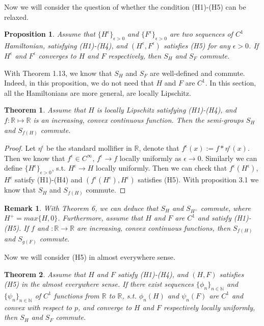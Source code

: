 \documentclass[preprint]{elsarticle}
\newtheorem{result}{\textbf{Theorem}}
\newtheorem{proposition}{Proposition}[section]
\newtheorem{remark}{Remark}[section]
\numberwithin{equation}{section}
\begin{document}
Now we will consider the question of whether the condition (H1)-(H5) can be relaxed.
\begin{proposition}
    Assume that $\{H^{\epsilon}\}_{\epsilon >0}$ and $\{F^{\epsilon}\}_{\epsilon >0}$ are two sequences of $C^1$ Hamiltonian, satisfying (H1)-(H4), and $(H^{\epsilon},F^{\epsilon})$ satisfies (H5) for any $\epsilon >0$. If $H^{\epsilon}$ and $F^{\epsilon}$ converges to  $H$ and $F$ respectively, then $S_H$ and $S_F$ commute.
\end{proposition}
With \cite{HT} Theorem 1.13, we know that $S_H$ and $S_F$ are well-defined and commute. Indeed, in this proposition, we do not need that $H$ and $F$ are $C^1$. In this section, all the Hamiltonians are more general, are locally Lipschitz.

\begin{result}
    Assume that $H$ is locally Lipschitz satisfying (H1)-(H4), and $f:\mathbb R \mapsto \mathbb R$ is an increasing, convex continuous function. Then the semi-groups $S_H$ and $S_{f(H)}$ commute.
\end{result}
\begin{proof}
    Let ${\eta}^{\epsilon}$ be the standard mollifier in $\mathbb R$, denote that $f^{\epsilon}(x):=f*\eta^{\epsilon}(x)$. Then we know that $f^{\epsilon}\in C^{\infty}$, $f^{\epsilon} \rightarrow f$ locally uniformly as $\epsilon \rightarrow 0$. Similarly we can define $\{H^{\epsilon}\}_{\epsilon >0}$, 
 s.t. $H^{\epsilon} \rightarrow H$ locally uniformly. Then we can check that $f^{\epsilon}(H^{\epsilon})$, $H^{\epsilon}$ satisfy (H1)-(H4) and $(f^{\epsilon}(H^{\epsilon}),H^{\epsilon})$ satisfies (H5). With proposition 3.1 we know that $S_H$ and $S_{f(H)}$ commute.
\end{proof}
\begin{remark}
    With Theorem 6, we can deduce that $S_H$ and $S_{H^+}$ commute, where $H^+=max\{H,0\}$. Furthermore, assume that $H$ and $F$ are $C^1$ and satisfy (H1)-(H5). If $f$ and $: \mathbb R \rightarrow \mathbb R$ are increasing, convex continuous functions, then $S_{f(H)}$ and $S_{g(F)}$ commute.
\end{remark}
Now we will consider (H5) in almost everywhere sense.
\begin{result}
    Assume that $H$ and $F$ satisfy (H1)-(H4), and $(H,F)$ satisfies (H5) in the almost everywhere sense. If there exist sequences $\{\phi_n\}_{n\in \mathbb N}$ and $\{\psi_n\}_{n\in \mathbb N}$ of $C^1$ functions from $\mathbb R$ to $\mathbb R$, s.t. $\phi_n(H)$ and $\psi_n(F)$ are $C^1$ and convex with respect to $p$, and converge to $H$ and $F$ respectively locally uniformly, then $S_H$ and $S_F$ commute.
\end{result}
\end{document}
